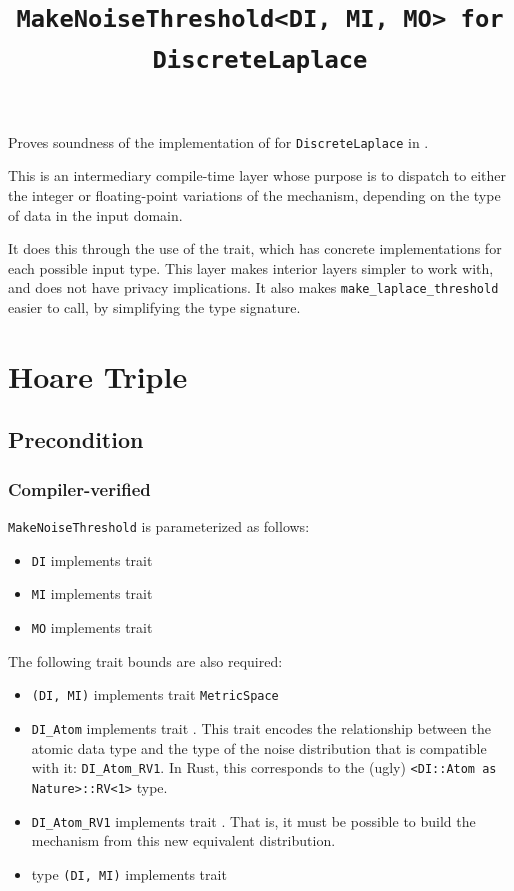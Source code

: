 \documentclass{article}
\title{\texttt{MakeNoiseThreshold<DI, MI, MO> for DiscreteLaplace}}
\author{\MichaelShoemateAuthor}
\date{}
\begin{document}
\maketitle

\contrib
Proves soundness of the implementation of 
for \texttt{DiscreteLaplace} in .

This is an intermediary compile-time layer whose purpose is
to dispatch to either the integer or floating-point variations of the mechanism,
depending on the type of data in the input domain.

It does this through the use of the  trait,
which has concrete implementations for each possible input type.
This layer makes interior layers simpler to work with, and does not have privacy implications.
It also makes \texttt{make\_laplace\_threshold} easier to call,
by simplifying the type signature.

\section{Hoare Triple}
\subsection*{Precondition}
\subsubsection*{Compiler-verified}
\texttt{MakeNoiseThreshold} is parameterized as follows:
\begin{itemize}
    \item \texttt{DI} implements trait 
    \item \texttt{MI} implements trait 
    \item \texttt{MO} implements trait 
\end{itemize}

The following trait bounds are also required:
\begin{itemize}
    \item \texttt{(DI, MI)} implements trait \texttt{MetricSpace}
    \item \texttt{DI\_Atom} implements trait .
        This trait encodes the relationship between the atomic data type
        and the type of the noise distribution that is compatible with it: \texttt{DI\_Atom\_RV1}.
        In Rust, this corresponds to the (ugly) \texttt{<DI::Atom as Nature>::RV<1>} type.
    \item \texttt{DI\_Atom\_RV1} implements trait .
        That is, it must be possible to build the mechanism from this new equivalent distribution.
    \item type \texttt{(DI, MI)} implements trait 
\end{itemize}
\end{document}
